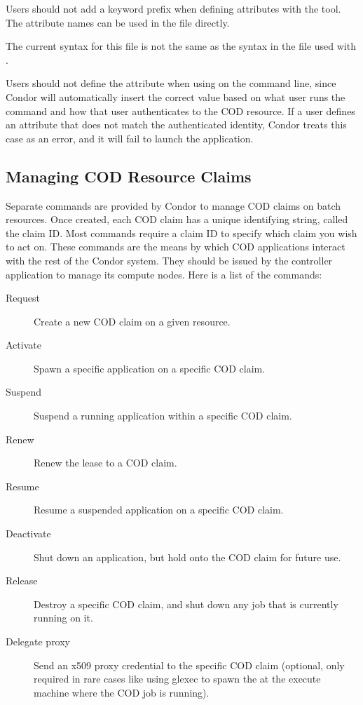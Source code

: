 Users should not add a keyword prefix 
when defining attributes with the  tool.
The attribute names can be used in the file directly.

\Warn The current syntax for this file is not the same as the syntax
in the file used with .

\Note Users should not define the  attribute
when using  on the command line, since Condor
will automatically insert the correct value based on what user runs the
 command and how that user authenticates to the
COD resource.
If a user defines an attribute that does not match the authenticated
identity, Condor treats this case as an error, and it will fail to launch the
application.


\subsection{\label{sec:cod-managing-claims}
Managing COD Resource Claims}

Separate commands are provided by Condor to manage COD
claims on batch resources.
Once created, each COD claim has a unique identifying string, called the
claim ID.
Most commands require a claim ID to specify which claim you wish to
act on. 
These commands are the means by which COD applications interact with
the rest of the Condor system.
They should be issued by the controller application to manage its
compute nodes.
Here is a list of the commands:

\begin{description}

\item [Request] Create a new COD claim on a given resource.

\item [Activate] Spawn a specific application on a specific COD claim.

\item [Suspend] Suspend a running application within a specific COD claim.

\item [Renew] Renew the lease to a COD claim.

\item [Resume] Resume a suspended application on a specific COD claim.

\item [Deactivate] Shut down an application, but hold onto the COD claim
  for future use.

\item [Release] Destroy a specific COD claim, and shut down any job that is
  currently running on it.

\item [Delegate proxy] Send an x509 proxy credential to the specific
  COD claim (optional, only required in rare cases like using glexec
  to spawn the  at the execute machine where the COD
  job is running).

\end{description}

